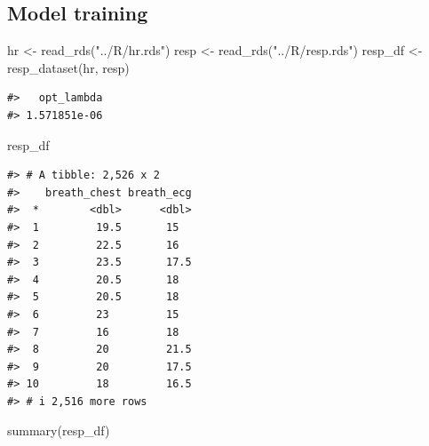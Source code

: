 \documentclass[
]{article}
\newenvironment{Shaded}{\begin{snugshade}}{\end{snugshade}}
\newcommand{\FunctionTok}[1]{\textcolor[rgb]{0.00,0.00,0.00}{#1}}
\newcommand{\NormalTok}[1]{#1}
\newcommand{\OtherTok}[1]{\textcolor[rgb]{0.56,0.35,0.01}{#1}}
\newcommand{\SpecialCharTok}[1]{\textcolor[rgb]{0.00,0.00,0.00}{#1}}
\newcommand{\StringTok}[1]{\textcolor[rgb]{0.31,0.60,0.02}{#1}}
\begin{document}
\hypertarget{model-training}{%
\subsection{Model training}\label{model-training}}

\begin{Shaded}
\begin{Highlighting}[]
\NormalTok{hr }\OtherTok{\textless{}{-}} \FunctionTok{read\_rds}\NormalTok{(}\StringTok{"../R/hr.rds"}\NormalTok{)}
\NormalTok{resp }\OtherTok{\textless{}{-}} \FunctionTok{read\_rds}\NormalTok{(}\StringTok{"../R/resp.rds"}\NormalTok{)}
\NormalTok{resp\_df }\OtherTok{\textless{}{-}} \FunctionTok{resp\_dataset}\NormalTok{(hr, resp)}
\end{Highlighting}
\end{Shaded}

\begin{Shaded}
\end{Shaded}

\begin{verbatim}
#>   opt_lambda 
#> 1.571851e-06
\end{verbatim}

\begin{Shaded}
\begin{Highlighting}[]
\NormalTok{resp\_df}
\end{Highlighting}
\end{Shaded}

\begin{verbatim}
#> # A tibble: 2,526 x 2
#>    breath_chest breath_ecg
#>  *        <dbl>      <dbl>
#>  1         19.5       15  
#>  2         22.5       16  
#>  3         23.5       17.5
#>  4         20.5       18  
#>  5         20.5       18  
#>  6         23         15  
#>  7         16         18  
#>  8         20         21.5
#>  9         20         17.5
#> 10         18         16.5
#> # i 2,516 more rows
\end{verbatim}

\begin{Shaded}
\begin{Highlighting}[]
\FunctionTok{summary}\NormalTok{(resp\_df)}
\end{Highlighting}
\end{Shaded}
\end{document}
